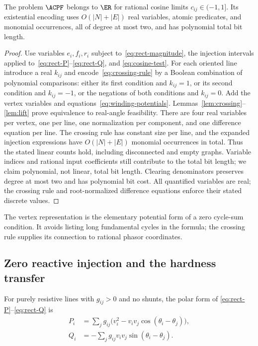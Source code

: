 \begin{theorem}
\label{thm:ac-membership}
The problem $\ACPF$ belongs to $\ER$ for rational cosine limits
$c_{ij}\in(-1,1]$. Its existential encoding uses $O(|N|+|E|)$ real
variables, atomic predicates, and monomial occurrences, all of degree
at most two, and has polynomial total bit length.
\end{theorem}
\begin{proof}
Use variables $e_i,f_i,r_i$ subject to~\eqref{eq:rect-magnitude}, the injection
intervals applied to~\eqref{eq:rect-P}--\eqref{eq:rect-Q}, and
\eqref{eq:cosine-test}. For each oriented line introduce a real $k_{ij}$ and
encode~\eqref{eq:crossing-rule} by a Boolean combination of polynomial
comparisons: either its first condition and $k_{ij}=1$, or its second
condition and $k_{ij}=-1$, or the negations of both conditions and $k_{ij}=0$.
Add the vertex variables and equations~\eqref{eq:winding-potentials}.
Lemmas~\ref{lem:crossing}--\ref{lem:lift} prove equivalence to real-angle
feasibility. There are four real variables per vertex, one per line,
one normalization per component, and one difference equation per line.
The crossing rule has constant size per line, and the expanded injection
expressions have $O(|N|+|E|)$ monomial occurrences in total. Thus the
stated linear counts hold, including disconnected and empty graphs.
Variable indices and rational input coefficients still contribute to the
total bit length; we claim polynomial, not linear, total bit length.
Clearing denominators preserves degree at most two and has polynomial
bit cost. All quantified variables are real; the crossing rule and
root-normalized difference equations enforce their stated discrete values.
\end{proof}

The vertex representation is the elementary potential form of a zero
cycle-sum condition. It avoids listing long fundamental cycles in the
formula; the crossing rule supplies its connection to rational phasor
coordinates.

\subsection{Zero reactive injection and the hardness transfer}

For purely resistive lines with $g_{ij}>0$ and no shunts, the polar form of
\eqref{eq:rect-P}--\eqref{eq:rect-Q} is
\begin{align}
 P_i&=\sum_j g_{ij}\bigl(v_i^2-v_iv_j\cos(\theta_i-\theta_j)\bigr),
 \label{eq:resistive-ac-P}\\
 Q_i&=-\sum_j g_{ij}v_iv_j\sin(\theta_i-\theta_j).
 \label{eq:resistive-ac-Q}
\end{align}

